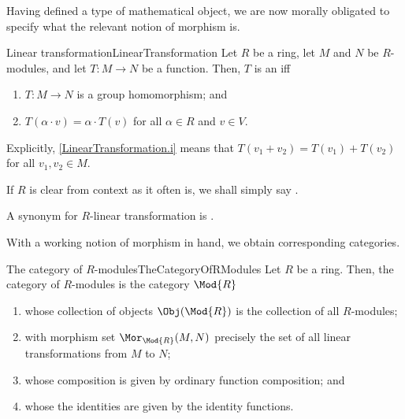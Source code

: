 Having defined a type of mathematical object, we are now morally obligated to specify what the relevant notion of morphism is.
\begin{dfn}{Linear transformation}{LinearTransformation}
Let $R$ be a ring, let $M$ and $N$ be $R$-modules, and let $T\colon M\rightarrow N$ be a function.  Then, $T$ is an  iff
\begin{enumerate}
\item \label{LinearTransformation.i}$T\colon M\rightarrow N$ is a group homomorphism; and
\item \label{LinearTransformation.ii}$T(\alpha \cdot v)=\alpha \cdot T(v)$ for all $\alpha \in R$ and $v\in V$.
\end{enumerate}
\begin{rmk}
Explicitly, \cref{LinearTransformation.i} means that $T(v_1+v_2)=T(v_1)+T(v_2)$ for all $v_1,v_2\in M$.
\end{rmk}
\begin{rmk}
If $R$ is clear from context as it often is, we shall simply say .
\end{rmk}
\begin{rmk}
A synonym for $R$-linear transformation is .
\end{rmk}
\end{dfn}
With a working notion of morphism in hand, we obtain corresponding categories.
\begin{exm}{The category of $R$-modules}{TheCategoryOfRModules}
Let $R$ be a ring.  Then, the category of $R$-modules is the category $\Mod{R}$
\begin{enumerate}
\item whose collection of objects $\Obj (\Mod{R})$ is the collection of all $R$-modules;
\item with morphism set $\Mor _{\Mod{R}}(M,N)$ precisely the set of all linear transformations from $M$ to $N$;
\item whose composition is given by ordinary function composition; and
\item whose the identities are given by the identity functions.
\end{enumerate}
\end{exm}
